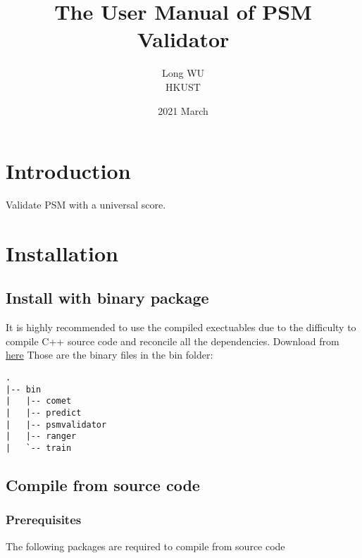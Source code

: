 \documentclass{ctexart}
\title{The User Manual of PSM Validator}
\date{2021 March}
\author{Long WU\\ HKUST}
\begin{document}
\maketitle


\tableofcontents

\section{Introduction}

Validate PSM with a universal score. 



\section{ Installation}

\subsection{Install with binary package}


It is highly recommended to use the compiled exectuables due to the difficulty to compile C++ source code and reconcile all the dependencies. Download from \href{https://github.com/wulongict/PSMValidator/releases/tag/v1.0.0} {here} 
Those are the binary files in the bin folder:  
\begin{verbatim}
.
|-- bin
|   |-- comet
|   |-- predict
|   |-- psmvalidator
|   |-- ranger
|   `-- train
\end{verbatim}


\subsection{ Compile from source code}

\subsubsection{Prerequisites}

The following packages are required to compile from source code  
\end{document}
